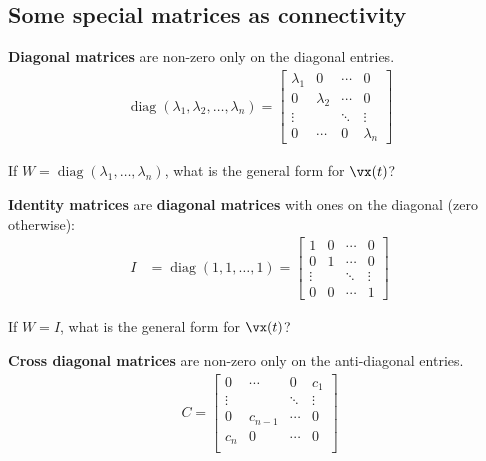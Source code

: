 \documentclass[a4paper,11pt]{exam}
\newcounter{ct}
\DeclareMathOperator*{\diag}{diag}
\begin{document}
\begin{questions}
\subsection{Some special matrices as connectivity}
\textbf{Diagonal matrices} are non-zero only on the diagonal entries.
\begin{align}\label{eq:LA:diag}
    \diag(\lambda_1, \lambda_2, \ldots, \lambda_n)
    =
    \begin{bmatrix}
	\lambda_1 & 0 & \cdots & 0 \\
	0 & \lambda_2 & \cdots & 0 \\
	\vdots & & \ddots & \vdots \\
	0 & \cdots & 0 & \lambda_n
    \end{bmatrix}
\end{align}

\question If $W = \diag(\lambda_1, \ldots, \lambda_n)$, what is the general form for $\vx(t)$?

\textbf{Identity matrices} are \textbf{diagonal matrices} with ones on the diagonal (zero otherwise):
\begin{align}\label{eq:LA:diag:eg}
    I &=
	\diag(1, 1, \ldots, 1)
    =
    \begin{bmatrix}
	1 & 0 & \cdots & 0\\
	0 & 1 & \cdots & 0\\
	\vdots &   & \ddots & \vdots\\
	0 & 0 & \cdots & 1
    \end{bmatrix}
\end{align}

\question If $W = I$, what is the general form for $\vx(t)$?

\textbf{Cross diagonal matrices} are non-zero only on the anti-diagonal entries.
\begin{align}\label{eq:LA:cdiag}
    C
    =
    \begin{bmatrix}
	0 & \cdots & 0 & c_1\\
	\vdots & & \ddots & \vdots \\
	0 & c_{n-1} & \cdots & 0 \\
	c_n & 0 & \cdots & 0 \\
    \end{bmatrix}
\end{align}


\end{questions}
\end{document}

